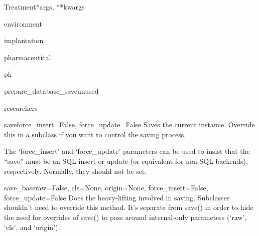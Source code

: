 \documentclass[letterpaper,10pt,english]{sphinxmanual}
\begin{document}
\begin{classdesc}{Treatment}{*args, **kwargs}
\hypertarget{data.models.Treatment.environment}{}\begin{memberdesc}[Treatment]{environment}\end{memberdesc}

\hypertarget{data.models.Treatment.implantation}{}\begin{memberdesc}[Treatment]{implantation}\end{memberdesc}

\hypertarget{data.models.Treatment.pharmaceutical}{}\begin{memberdesc}[Treatment]{pharmaceutical}\end{memberdesc}

\hypertarget{data.models.Treatment.pk}{}\begin{memberdesc}[Treatment]{pk}\end{memberdesc}

\hypertarget{data.models.Treatment.prepare_database_save}{}\begin{methoddesc}[Treatment]{prepare\_database\_save}{unused}\end{methoddesc}

\hypertarget{data.models.Treatment.researchers}{}\begin{memberdesc}[Treatment]{researchers}\end{memberdesc}

\hypertarget{data.models.Treatment.save}{}\begin{methoddesc}[Treatment]{save}{force\_insert=False, force\_update=False}
Saves the current instance. Override this in a subclass if you want to
control the saving process.

The `force\_insert' and `force\_update' parameters can be used to insist
that the ``save'' must be an SQL insert or update (or equivalent for
non-SQL backends), respectively. Normally, they should not be set.
\end{methoddesc}

\hypertarget{data.models.Treatment.save_base}{}\begin{methoddesc}[Treatment]{save\_base}{raw=False, cls=None, origin=None, force\_insert=False, force\_update=False}
Does the heavy-lifting involved in saving. Subclasses shouldn't need to
override this method. It's separate from save() in order to hide the
need for overrides of save() to pass around internal-only parameters
(`raw', `cls', and `origin').
\end{methoddesc}


\end{classdesc}
\end{document}
